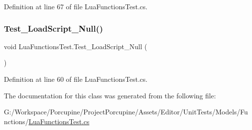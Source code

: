 Definition at line 67 of file Lua\+Functions\+Test.\+cs.

\mbox{\label{class_lua_functions_test_a2b59f05675761eb487858a01ea3ea825}} 
\subsubsection{\texorpdfstring{Test\+\_\+\+Load\+Script\+\_\+\+Null()}{Test\_LoadScript\_Null()}}
{\footnotesize\ttfamily void Lua\+Functions\+Test.\+Test\+\_\+\+Load\+Script\+\_\+\+Null (\begin{DoxyParamCaption}{ }\end{DoxyParamCaption})}



Definition at line 60 of file Lua\+Functions\+Test.\+cs.



The documentation for this class was generated from the following file\+:\begin{DoxyCompactItemize}
\item 
G\+:/\+Workspace/\+Porcupine/\+Project\+Porcupine/\+Assets/\+Editor/\+Unit\+Tests/\+Models/\+Functions/\hyperlink{_lua_functions_test_8cs}{Lua\+Functions\+Test.\+cs}\end{DoxyCompactItemize}
